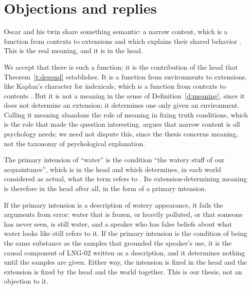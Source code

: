 \documentclass{situationist-preprint}
\begin{document}
\section{Objections and replies}

\begin{objection}
Oscar and his twin share something semantic: a narrow content, which is a function from contexts to extensions and which explains their shared behavior \citep{Fodor1987}. This is the real meaning, and it is in the head.
\end{objection}

\begin{reply}
We accept that there is such a function; it is the contribution of the head that Theorem~\ref{t:depend} establishes. It is a function from environments to extensions, like Kaplan's character for indexicals, which is a function from contexts to contents \citep{Kaplan1989}. But it is not a meaning in the sense of Definition~\ref{d:meaning}, since it does not determine an extension; it determines one only given an environment. Calling it meaning abandons the role of meaning in fixing truth conditions, which is the role that made the question interesting. \citet{Segal2000} argues that narrow content is all psychology needs; we need not dispute this, since the thesis concerns meaning, not the taxonomy of psychological explanation.
\end{reply}

\begin{objection}
The primary intension of \enquote{water} is the condition \enquote{the watery stuff of our acquaintance}, which is in the head and which determines, in each world considered as actual, what the term refers to \citep{Chalmers2002,Jackson1998}. Its extension-determining meaning is therefore in the head after all, in the form of a primary intension.
\end{objection}

\begin{reply}
If the primary intension is a description of watery appearance, it fails the arguments from error: water that is frozen, or heavily polluted, or that someone has never seen, is still water, and a speaker who has false beliefs about what water looks like still refers to it. If the primary intension is the condition of being the same substance as the samples that grounded the speaker's use, it is the causal component of LNG-02 written as a description, and it determines nothing until the samples are given. Either way, the intension is fixed in the head and the extension is fixed by the head and the world together. This is our thesis, not an objection to it.
\end{reply}
\end{document}
